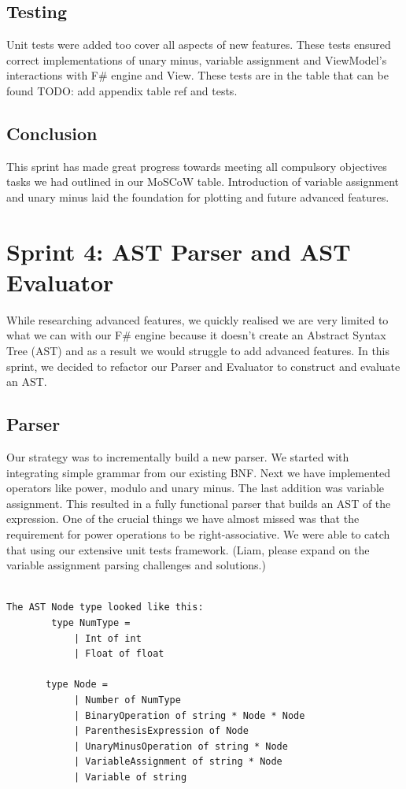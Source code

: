 \documentclass[a4paper, oneside, 11pt]{report}
\begin{document}
\subsection{Testing}
Unit tests were added too cover all aspects of new features. These tests ensured correct implementations of unary minus, variable assignment and ViewModel’s interactions with F# engine and View. These tests are in the table that can be found TODO: add appendix table ref and tests.


\subsection{Conclusion}
This sprint has made great progress towards meeting all compulsory objectives tasks we had outlined in our MoSCoW table. Introduction of variable assignment and unary minus laid the foundation for plotting and future advanced features.



\section{Sprint 4: AST Parser and AST Evaluator}
While researching advanced features, we quickly realised we are very limited to what we can with our F\# engine because it doesn’t create an Abstract Syntax Tree (AST) and as a result we would struggle to add advanced features. In this sprint, we decided to refactor our Parser and Evaluator to construct and evaluate an AST.

\subsection{Parser}
Our strategy was to incrementally build a new parser. We started with integrating simple grammar from our existing BNF. Next we have implemented operators like power, modulo and unary minus. The last addition was variable assignment. This resulted in a fully functional parser that builds an AST of the expression. One of the crucial things we have almost missed was that the requirement for power operations to be right-associative. We were able to catch that using our extensive unit tests framework.
(Liam, please expand on the variable assignment parsing challenges and solutions.)
\begin{verbatim}
    
The AST Node type looked like this:
        type NumType =
            | Int of int
            | Float of float

       type Node =
            | Number of NumType
            | BinaryOperation of string * Node * Node
            | ParenthesisExpression of Node
            | UnaryMinusOperation of string * Node
            | VariableAssignment of string * Node
            | Variable of string
\end{verbatim}
\end{document}
